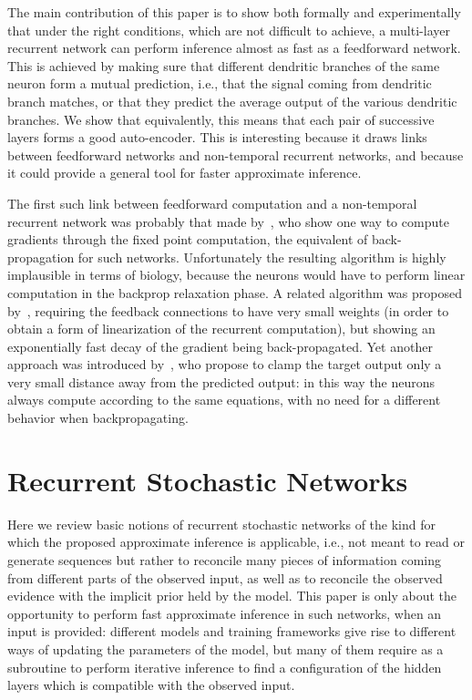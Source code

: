 \documentclass{article}
\begin{document}
The main contribution of this paper is to show both formally and experimentally
that under the right
conditions, which are not difficult to achieve, a multi-layer recurrent
network can perform inference almost as fast as a feedforward network.
This is achieved by making sure that different dendritic branches
of the same neuron form a mutual prediction, i.e., that the signal coming
from dendritic branch matches, or that they predict
the average output of the various dendritic branches. We show that equivalently, this means that
each pair of successive layers forms a good auto-encoder.
This is interesting because it draws links between feedforward
networks and non-temporal recurrent networks, and because it could provide a
general tool for faster approximate inference.

The first such link between feedforward computation and a non-temporal recurrent network
was probably that made by~\citet{Pineda87,Almeida87}, who show one way to compute gradients
  through the fixed point computation, the equivalent of back-propagation
  for such networks. Unfortunately the resulting algorithm is highly implausible in terms of biology,
  because the neurons would have to perform linear computation in the backprop relaxation phase.
  A related algorithm was proposed by~\cite{Xie+Seung-2003}, requiring the feedback connections
  to have very small weights (in order to obtain a form of linearization of the recurrent computation),
  but showing an exponentially fast decay of the gradient being back-propagated.
  Yet another approach was introduced by~\citet{Scellier+Bengio-arxiv2016}, who propose
  to clamp the target output only a very small distance away from the predicted output:
  in this way the neurons always compute according to the same equations, with no
  need for a different behavior when backpropagating.

\section{Recurrent Stochastic Networks}

Here we review basic notions of recurrent stochastic networks of the kind
for which the proposed approximate inference is applicable, i.e., not meant
to read or generate sequences but rather to reconcile many pieces of information
coming from different parts of the observed input, as well as to reconcile
the observed evidence with the implicit prior held by the model. This paper
is only about the opportunity to perform fast approximate inference in such
networks, when an input is provided: different models and training
frameworks give rise to different ways of updating the parameters of the
model, but many of them require as a subroutine to perform iterative
inference to find a configuration of the hidden layers which is compatible
with the observed input.
\end{document}
